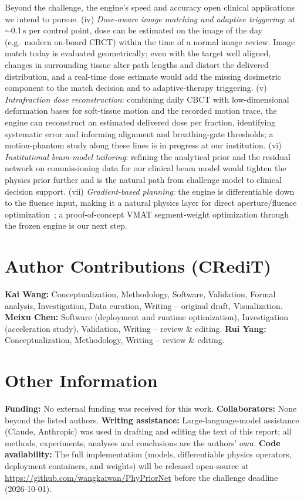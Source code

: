 \documentclass{llncs}
\begin{document}
Beyond the challenge, the engine's speed and accuracy open clinical applications we intend to
pursue. (iv) \emph{Dose-aware image matching and adaptive triggering}: at $\sim$0.1\,s per
control point, dose can be estimated on the image of the day (e.g.\ modern on-board CBCT)
within the time of a normal image review. Image match today is evaluated geometrically; even
with the target well aligned, changes in surrounding tissue alter path lengths and distort the
delivered distribution, and a real-time dose estimate would add the missing dosimetric component
to the match decision and to adaptive-therapy triggering. (v) \emph{Intrafraction dose
reconstruction}: combining daily CBCT with low-dimensional deformation bases for soft-tissue
motion and the recorded motion trace, the engine can reconstruct an estimated delivered dose
per fraction, identifying systematic error and informing alignment and breathing-gate
thresholds; a motion-phantom study along these lines is in progress at our institution. (vi)
\emph{Institutional beam-model tailoring}: refining the analytical prior and the residual
network on commissioning data for our clinical beam model would tighten the physics prior
further and is the natural path from challenge model to clinical decision support. (vii)
\emph{Gradient-based planning}: the engine is differentiable down to the fluence input, making
it a natural physics layer for direct aperture/fluence
optimization~\cite{pydosert,achlatis}; a proof-of-concept VMAT segment-weight optimization
through the frozen engine is our next step.

\section{Author Contributions (CRediT)}
\textbf{Kai Wang:} Conceptualization, Methodology, Software, Validation, Formal analysis,
Investigation, Data curation, Writing -- original draft, Visualization.
\textbf{Meixu Chen:} Software (deployment and runtime optimization), Investigation
(acceleration study), Validation, Writing -- review \& editing.
\textbf{Rui Yang:} Conceptualization, Methodology, Writing -- review \& editing.

\section{Other Information}
\textbf{Funding:} No external funding was received for this work.
\textbf{Collaborators:} None beyond the listed authors.
\textbf{Writing assistance:} Large-language-model assistance (Claude, Anthropic) was used in drafting and editing the text of this report; all methods, experiments, analyses and conclusions are the authors' own.
\textbf{Code availability:} The full implementation (models, differentiable physics operators,
deployment containers, and weights) will be released open-source at
\url{https://github.com/wangkaiwan/PhyPriorNet} before the challenge deadline (2026-10-01).
\end{document}
